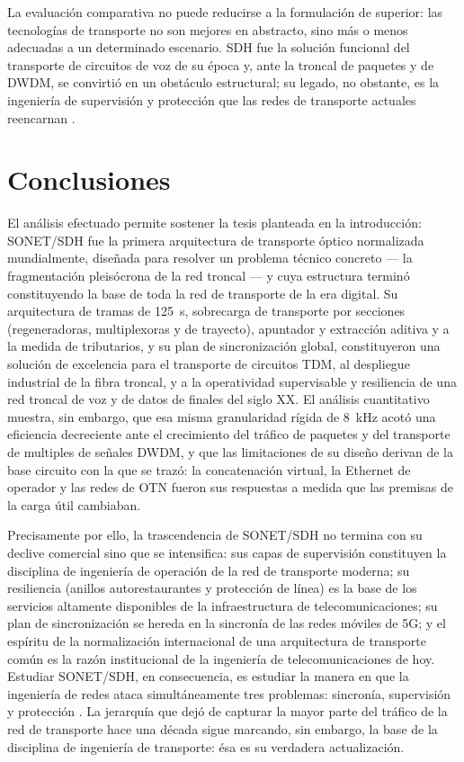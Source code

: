\documentclass[12pt,a4paper]{article}
\begin{document}
La evaluación comparativa no puede reducirse a la formulación de superior: las tecnologías de transporte no son mejores en abstracto, sino más o menos adecuadas a un determinado escenario. SDH fue la solución funcional del transporte de circuitos de voz de su época y, ante la troncal de paquetes y de DWDM, se convirtió en un obstáculo estructural; su legado, no obstante, es la ingeniería de supervisión y protección que las redes de transporte actuales reencarnan \cite{ituotn, ituG803, kurose2017}.

\section{Conclusiones}

El análisis efectuado permite sostener la tesis planteada en la introducción: SONET/SDH fue la primera arquitectura de transporte óptico normalizada mundialmente, diseñada para resolver un problema técnico concreto --- la fragmentación pleisócrona de la red troncal --- y cuya estructura terminó constituyendo la base de toda la red de transporte de la era digital. Su arquitectura de tramas de 125~\textmu s, sobrecarga de transporte por secciones (regeneradoras, multiplexoras y de trayecto), apuntador y extracción aditiva y a la medida de tributarios, y su plan de sincronización global, constituyeron una solución de excelencia para el transporte de circuitos TDM, al despliegue industrial de la fibra troncal, y a la operatividad supervisable y resiliencia de una red troncal de voz y de datos de finales del siglo XX. El análisis cuantitativo muestra, sin embargo, que esa misma granularidad rígida de 8~kHz acotó una eficiencia decreciente ante el crecimiento del tráfico de paquetes y del transporte de multiples de señales DWDM, y que las limitaciones de su diseño derivan de la base circuito con la que se trazó: la concatenación virtual, la Ethernet de operador y las redes de OTN fueron sus respuestas a medida que las premisas de la carga útil cambiaban.

Precisamente por ello, la trascendencia de SONET/SDH no termina con su declive comercial sino que se intensifica: sus capas de supervisión constituyen la disciplina de ingeniería de operación de la red de transporte moderna; su resiliencia (anillos autorestaurantes y protección de línea) es la base de los servicios altamente disponibles de la infraestructura de telecomunicaciones; su plan de sincronización se hereda en la sincronía de las redes móviles de 5G; y el espíritu de la normalización internacional de una arquitectura de transporte común es la razón institucional de la ingeniería de telecomunicaciones de hoy. Estudiar SONET/SDH, en consecuencia, es estudiar la manera en que la ingeniería de redes ataca simultáneamente tres problemas: sincronía, supervisión y protección \cite{itug707, ituG803, ituotn, ituG8261}. La jerarquía que dejó de capturar la mayor parte del tráfico de la red de transporte hace una década sigue marcando, sin embargo, la base de la disciplina de ingeniería de transporte: ésa es su verdadera actualización.
\end{document}
